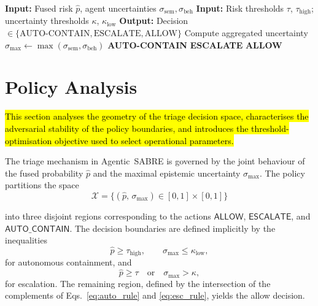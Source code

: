 \documentclass[3p]{elsarticle}
\begin{document}
\begin{algorithm}[t]
\caption{Uncertainty-Aware Triage Policy}
\label{alg:triage_policy}
\begin{algorithmic}[1]
    \State \textbf{Input:} Fused risk $\hat{p}$, agent uncertainties $\sigma_{\text{sem}}, \sigma_{\text{beh}}$
    \State \textbf{Input:} Risk thresholds $\tau$, $\tau_{\text{high}}$; uncertainty thresholds $\kappa$, $\kappa_{\text{low}}$
    \State \textbf{Output:} Decision $\in \{\text{AUTO-CONTAIN}, \text{ESCALATE}, \text{ALLOW}\}$
    \vspace{1mm}
    \State Compute aggregated uncertainty $\sigma_{\max} \gets \max(\sigma_{\text{sem}}, \sigma_{\text{beh}})$
    \vspace{1mm}
        \State \Return \textbf{AUTO-CONTAIN} 
        \State \Return \textbf{ESCALATE} 
    \Else
        \State \Return \textbf{ALLOW} 
    \EndIf
\end{algorithmic}
\end{algorithm}

\section{Policy Analysis}
\label{sec:policydiscussion}

\hl{This section analyses the geometry of the triage decision space, characterises the adversarial
stability of the policy boundaries, and introduces the threshold-optimisation objective used
to select operational parameters.}

The triage mechanism in Agentic~SABRE is governed by the joint behaviour of the fused probability \(\hat{p}\) and the maximal epistemic uncertainty \(\sigma_{\max}\). The policy partitions the space
\begin{equation}
\mathcal{X} = \bigl\{ (\hat{p},\,\sigma_{\max}) \in [0,1] \times [0,1] \bigr\}
\label{eq:policy_space}
\end{equation}

into three disjoint regions corresponding to the actions \(\mathsf{ALLOW}\), \(\mathsf{ESCALATE}\), and \(\mathsf{AUTO\_CONTAIN}\). The decision boundaries are defined implicitly by the inequalities
\begin{equation}
\hat{p} \ge \tau_{\mathrm{high}}, \qquad \sigma_{\max} \le \kappa_{\mathrm{low}},
\label{eq:auto_rule}
\end{equation}
for autonomous containment, and
\begin{equation}
\hat{p} \ge \tau \quad \text{or} \quad \sigma_{\max} > \kappa,
\label{eq:esc_rule}
\end{equation}
for escalation. The remaining region, defined by the intersection of the complements of Eqs.~\eqref{eq:auto_rule} and \eqref{eq:esc_rule}, yields the allow decision.
\end{document}
